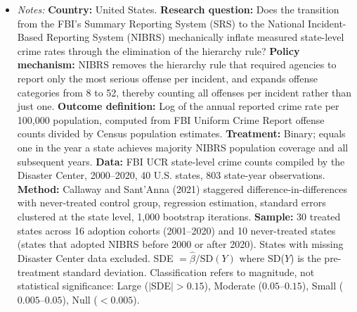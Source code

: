 \begin{table}[!htbp]
\vspace{0.5em}
\begin{minipage}{0.95\textwidth}
\begin{itemize}[leftmargin=*,nosep]
\item \textit{Notes:} \textbf{Country:} United States. \textbf{Research question:} Does the transition from the FBI's Summary Reporting System (SRS) to the National Incident-Based Reporting System (NIBRS) mechanically inflate measured state-level crime rates through the elimination of the hierarchy rule? \textbf{Policy mechanism:} NIBRS removes the hierarchy rule that required agencies to report only the most serious offense per incident, and expands offense categories from 8 to 52, thereby counting all offenses per incident rather than just one. \textbf{Outcome definition:} Log of the annual reported crime rate per 100,000 population, computed from FBI Uniform Crime Report offense counts divided by Census population estimates. \textbf{Treatment:} Binary; equals one in the year a state achieves majority NIBRS population coverage and all subsequent years. \textbf{Data:} FBI UCR state-level crime counts compiled by the Disaster Center, 2000--2020, 40 U.S. states, 803 state-year observations. \textbf{Method:} Callaway and Sant'Anna (2021) staggered difference-in-differences with never-treated control group, regression estimation, standard errors clustered at the state level, 1,000 bootstrap iterations. \textbf{Sample:} 30 treated states across 16 adoption cohorts (2001--2020) and 10 never-treated states (states that adopted NIBRS before 2000 or after 2020). States with missing Disaster Center data excluded. SDE $= \hat{\beta} / \text{SD}(Y)$ where SD($Y$) is the pre-treatment standard deviation. Classification refers to magnitude, not statistical significance: Large ($|$SDE$| > 0.15$), Moderate ($0.05$--$0.15$), Small ($0.005$--$0.05$), Null ($< 0.005$).
\end{itemize}
\end{minipage}
\end{table}

